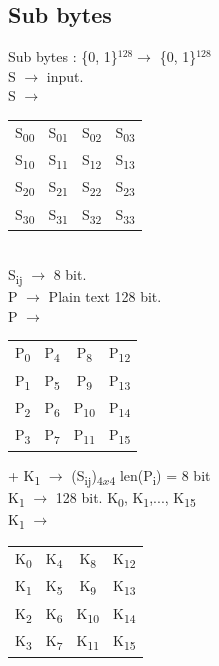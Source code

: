\documentclass[11pt]{article}
\begin{document}
	\subsection{Sub bytes}
	\centering Sub bytes : \{0, 1\}$^{128} \rightarrow$ \{0, 1\}$^{128}$\\\flushleft
	S $\rightarrow$ input.\vspace{0.2cm}\\
	\centering S $\rightarrow$ 
	\begin{tabular}{| c c c c |}
		S\textsubscript{00} & S\textsubscript{01} & S\textsubscript{02} & S\textsubscript{03}\\
		S\textsubscript{10} & S\textsubscript{11} & S\textsubscript{12} & S\textsubscript{13}\\
		S\textsubscript{20} & S\textsubscript{21} & S\textsubscript{22} & S\textsubscript{23}\\
		S\textsubscript{30} & S\textsubscript{31} & S\textsubscript{32} & S\textsubscript{33}
	\end{tabular}\vspace{0.2cm}\\
	S\textsubscript{ij} $\rightarrow$ 8 bit.\\
	\flushleft
	P $\rightarrow$ Plain text 128 bit.\vspace{0.2cm}\\
	P $\rightarrow$ 
	\begin{tabular}{| c c c c |}
		P\textsubscript{0} & P\textsubscript{4} & P\textsubscript{8} & P\textsubscript{12}\\
		P\textsubscript{1} & P\textsubscript{5} & P\textsubscript{9} & P\textsubscript{13}\\
		P\textsubscript{2} & P\textsubscript{6} & P\textsubscript{10} & P\textsubscript{14}\\
		P\textsubscript{3} & P\textsubscript{7} & P\textsubscript{11} & P\textsubscript{15}
	\end{tabular} 
	+ K\textsubscript{1} $\rightarrow$ (S\textsubscript{ij})\textsubscript{$4x4$} \hfill len(P\textsubscript{i}) = 8 bit\vspace{0.2cm}\\
	K\textsubscript{1} $\rightarrow$ 128 bit. K\textsubscript{0}, K\textsubscript{1},..., K\textsubscript{15}\vspace{0.2cm}\\ 
	K\textsubscript{1} $\rightarrow$ 
	\begin{tabular}{| c c c c |}
		K\textsubscript{0} & K\textsubscript{4} & K\textsubscript{8} & K\textsubscript{12}\\
		K\textsubscript{1} & K\textsubscript{5} & K\textsubscript{9} & K\textsubscript{13}\\
		K\textsubscript{2} & K\textsubscript{6} & K\textsubscript{10} & K\textsubscript{14}\\
		K\textsubscript{3} & K\textsubscript{7} & K\textsubscript{11} & K\textsubscript{15}
	\end{tabular} 
\end{document}
